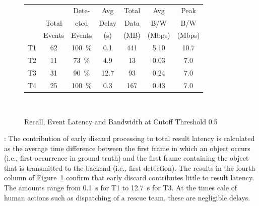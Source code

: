 \begin{figure}
\centering
\begin{tabular}{|c|c|c|c|c|c|c|}
\hline
   &        &Dete-       &Avg&Total&Avg&Peak\\
   &Total&cted&Delay&Data&B/W&B/W\\
   &Events&Events&(s)&(MB)&(Mbps)&(Mbps)\\ 

\hline
\small
T1 & \phantom{0}62  & 100~\%       &  \phantom{0}0.1&\phantom{0}441  &  5.10     &   10.7  \\
\hline
T2 & \phantom{0}11  & \phantom{0}73~\%      & \phantom{0}4.9 & \phantom{00}13            &  0.03 & \phantom{0}7.0 \\ %
\hline
T3 & \phantom{0}31  & \phantom{0}90~\%  & 12.7 & \phantom{00}93  &  0.24 &  \phantom{0}7.0 \\ %
\hline
T4 & \phantom{0}25  & 100~\%       & \phantom{0}0.3 & \phantom{0}167  &  0.43 &  \phantom{0}7.0 \\
\hline
\end{tabular}\\
\caption{Recall, Event Latency and Bandwidth at Cutoff Threshold 0.5}
\label{fig:early-discard-results}
\end{figure}

: The contribution of early discard processing
to total result latency is calculated as the average time difference between the
first frame in which an object occurs (i.e., first occurrence in ground truth)
and the first frame containing the object that is transmitted to the backend
(i.e., first detection). The results in the fourth column of
Figure~\ref{fig:early-discard-results} confirm that early discard contributes
little to result latency. The amounts range from 0.1~s for T1 to 12.7~s for T3.
At the times cale of human actions such as dispatching of a rescue team, these
are negligible delays.

